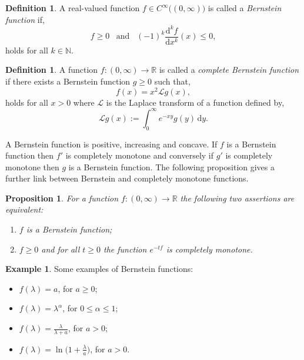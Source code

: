 \documentclass[a4paper, 12pt]{report}
\theoremstyle{cor}
\newtheorem{prop}[theorem]{Proposition}
\theoremstyle{remark}
\theoremstyle{definition}
\newtheorem{defn}[theorem]{Definition}
\newtheorem{eg}[theorem]{Example}
\begin{document}
\begin{defn}
A real-valued function $f \in C^\infty\big((0, \infty)\big)$ is called a \emph{Bernstein function} if,
\begin{equation}
f \ge 0 \,\,\,\,\, \text{and} \,\,\,\,\, (-1)^k\frac{\mathrm{d}^kf}{\mathrm{d}x^k}(x) \le 0,
\end{equation}
holds for all $k \in \mathbb{N}$.
\end{defn}

\begin{defn}
A function $f : (0, \infty) \to \mathbb{R}$ is called a \emph{complete Bernstein function} if there exists a Bernstein function $g \ge 0$ such that,
\begin{equation}
f(x) = x^2\mathcal{L}g(x),
\end{equation}
holds for all $x > 0$ where $\mathcal{L}$ is the Laplace transform of a function defined by,
$$
\mathcal{L}g(x) := \int_0^\infty e^{-xy}g(y)\,\mathrm{d}y.
$$
\end{defn}

A Bernstein function is positive, increasing and concave.  If $f$ is a Bernstein function then $f'$ is completely monotone and conversely if $g'$ is completely monotone then $g$ is a Bernstein function.  The following proposition gives a further link between Bernstein and completely monotone functions.

\begin{prop}
For a function $f : (0, \infty) \to \mathbb{R}$ the following two assertions are equivalent:
\begin{enumerate}
\item $f$ is a Bernstein function;

\item $f \ge 0$ and for all $t \ge 0$ the function $e^{-tf}$ is completely monotone.
\end{enumerate}
\end{prop}

\begin{eg}
Some examples of Bernstein functions:
\begin{itemize}
\item $f(\lambda) = a$, for $a \ge 0$;

\item $f(\lambda) = \lambda^\alpha$, for $0 \le \alpha \le 1$;

\item $f(\lambda) = \frac{\lambda}{\lambda + a}$, for $a > 0$;

\item $f(\lambda) = \ln\big(1 + \frac{\lambda}{a}\big)$, for $a > 0$.
\end{itemize}
\end{eg}
\end{document}
